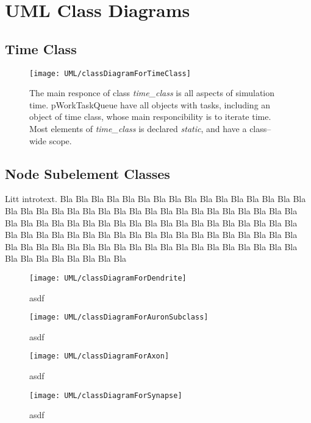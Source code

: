 \chapter{UML Class Diagrams}

\section{Time Class}
		\begin{figure}[hbt!p]
			\centerline{ \texttt{[image: UML/classDiagramForTimeClass]} }
			\caption[UML class diagram for \emph{time\_class}]{
				The main responce of class \emph{time\_class} is all aspects of simulation time. 
				pWorkTaskQueue have all objects with tasks, including an object of time class, whose main responcibility is to iterate time.
				Most elements of \emph{time\_class} is declared \emph{static}, and have a class--wide scope.
					}
		\end{figure}

\section{Node Subelement Classes}
\label{appendixUMLofAllNodeSubelementClasses}
	Litt introtext. Bla Bla Bla Bla Bla Bla Bla Bla Bla Bla Bla Bla Bla Bla Bla Bla Bla Bla Bla Bla Bla Bla Bla Bla Bla Bla Bla Bla Bla Bla Bla Bla Bla Bla Bla Bla Bla Bla Bla Bla Bla Bla Bla Bla Bla Bla Bla Bla Bla Bla Bla Bla Bla Bla Bla Bla Bla Bla Bla Bla Bla Bla Bla Bla Bla Bla Bla Bla Bla Bla Bla Bla Bla Bla Bla Bla Bla Bla Bla Bla Bla Bla Bla Bla Bla Bla Bla Bla Bla Bla Bla Bla Bla Bla Bla Bla Bla Bla Bla Bla 

		\begin{figure}[hbt!p]
			\centerline{ \texttt{[image: UML/classDiagramForDendrite]} }
			\caption[UML class diagram for dendrite subelement]{asdf}
		\end{figure}

		\begin{figure}[hbt!p]
			\centerline{ \texttt{[image: UML/classDiagramForAuronSubclass]} }
			\caption[UML class diagram for auron subelement]{asdf}
		\end{figure}

		\begin{figure}[hbt!p]
			\centerline{ \texttt{[image: UML/classDiagramForAxon]} }
			\caption[UML class diagram for axon subelement]{asdf}
		\end{figure}

		\begin{figure}[hbt!p]
			\centerline{ \texttt{[image: UML/classDiagramForSynapse]} }
			\caption[UML class diagram for synapse subelement]{asdf}
		\end{figure}
\newpage
	
